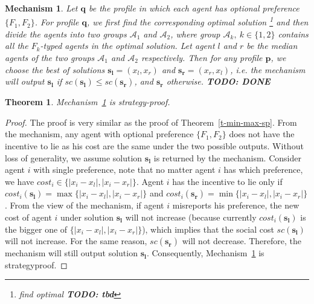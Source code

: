 \documentclass[twoside,11pt]{article}
\newtheorem{theorem}{Theorem}
\newtheorem{mechanism}{Mechanism}
\newcommand{\bd}{\mathbf}
\newcommand{\todo}[1]{}
\renewcommand{\todo}[1]{{\textbf{\color{red} TODO: {#1}}}}
\begin{document}
\begin{mechanism}\label{mech-socialmin}
Let $\bd{q}$ be the profile in which each agent has optional preference $\{F_1, F_2\}$.
For profile $\bd{q}$, we first find the corresponding optimal solution \footnote{find optimal \todo{tbd}} and then divide the agents into two groups $\mathcal{A}_1$ and $\mathcal{A}_2$, where group $\mathcal{A}_k,~k\in\{1,2\}$ contains all the $F_k$-typed agents in the optimal solution.
Let agent $l$ and $r$ be the median agents of the two groups $\mathcal{A}_1$ and $\mathcal{A}_2$ respectively.
Then for any profile $\bd{p}$, we choose the best of solutions $\bd{s_l} = (x_l, x_r)$ and $\bd{s_r} = (x_r, x_l)$, i.e. the mechanism will output $\bd{s_l}$ if $sc (\bd{s_l})\leq sc (\bd{s_r})$, and $\bd{s_r}$ otherwise.
\todo{DONE}
\end{mechanism}
%
\begin{theorem}\label{t-min-social-sp}
Mechanism~\ref{mech-socialmin} is strategy-proof.
\end{theorem}
\begin{proof}
The proof is very similar as the proof of Theorem~\ref{t-min-max-sp}.
From the mechanism, any agent with optional preference $\{F_1,F_2\}$ does not have the incentive to lie as his cost are the same under the two possible outputs.
%
Without loss of generality, we assume solution $\bd{s_l}$ is returned by the mechanism.
%
Consider agent $i$ with single preference,
note that no matter agent $i$ has which preference, we have $cost_i \in \{|x_i-x_l|,|x_i-x_r|\}$.
%
Agent $i$ has the incentive to lie only if $cost_i(\bd{s_l}) = \max\{|x_i-x_l|,|x_i-x_r|\}$ and $cost_i(\bd{s_r}) = \min\{|x_i-x_l|,|x_i-x_r|\}$.
%
From the view of the mechanism, if agent $i$ misreports his preference, the new cost of agent $i$ under solution $\bd{s_l}$ will not increase (because currently $cost_i(\bd{s_l})$ is the bigger one of $\{|x_i-x_l|,|x_i-x_r|\}$), which implies that the social cost $sc(\bd{s_l})$ will not increase. For the same reason, $sc(\bd{s_r})$ will not decrease. Therefore, the mechanism will still output solution $\bd{s_l}$.
Consequently, Mechanism~\ref{mech-socialmin} is strategyproof.
\end{proof}
\end{document}
